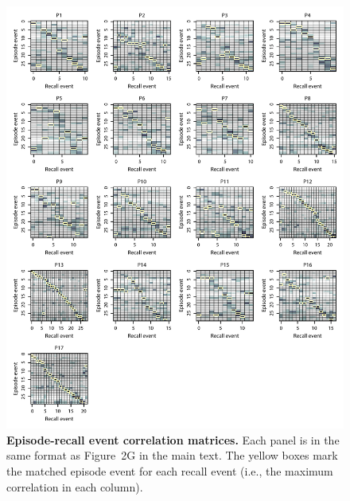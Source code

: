 \documentclass{article}
\begin{document}
\begin{figure}[p!]
\centering
\includegraphics[width=\textwidth]{figs/matchmats}
\caption{\small \textbf{Episode-recall event correlation matrices.}  Each panel is in the same format as Figure~2G in the main text.  The yellow boxes mark the matched episode event for each recall event (i.e., the maximum correlation in each column).}
\label{fig:matchmats}
\end{figure}
\end{document}
